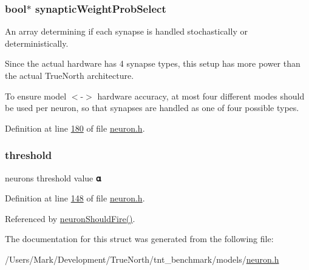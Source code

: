 \hypertarget{structneuron_state_a4568f103808a436a62d7c7c47dc90e9b}{}
\subsubsection[{synaptic\+Weight\+Prob\+Select}]{\setlength{\rightskip}{0pt plus 5cm}bool$\ast$ synaptic\+Weight\+Prob\+Select}\label{structneuron_state_a4568f103808a436a62d7c7c47dc90e9b}


An array determining if each synapse is handled stochastically or deterministically. 

Since the actual hardware has 4 synapse types, this setup has more power than the actual True\+North architecture.

To ensure model $<$-\/$>$ hardware accuracy, at most four different modes should be used per neuron, so that synapses are handled as one of four possible types. 

Definition at line \hyperlink{neuron_8h_source_l00180}{180} of file \hyperlink{neuron_8h_source}{neuron.\+h}.

\hypertarget{structneuron_state_a132470c4c17828c209e3403ccf7ee680}{}
\subsubsection[{threshold}]{ threshold}\label{structneuron_state_a132470c4c17828c209e3403ccf7ee680}


neuron\textquotesingle{}s threshold value 𝛂 



Definition at line \hyperlink{neuron_8h_source_l00148}{148} of file \hyperlink{neuron_8h_source}{neuron.\+h}.



Referenced by \hyperlink{neuron_8c_source_l00157}{neuron\+Should\+Fire()}.



The documentation for this struct was generated from the following file\+:\begin{DoxyCompactItemize}
\item 
/\+Users/\+Mark/\+Development/\+True\+North/tnt\+\_\+benchmark/models/\hyperlink{neuron_8h}{neuron.\+h}\end{DoxyCompactItemize}
